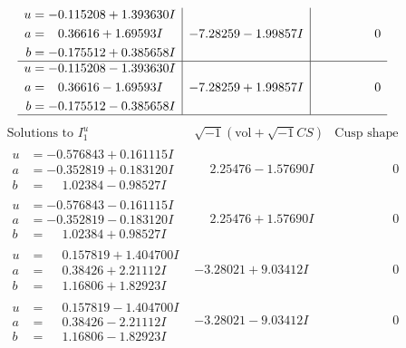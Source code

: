 \documentclass[1p]{elsarticle_modified}
\theoremstyle{definition}
\newcommand{\I}{\sqrt{-1}}
\begin{document}
$$\begin{array}{c|c|c}
\begin{aligned}
u &= -0.115208 + 1.393630 I \\
a &= \phantom{-}0.36616 + 1.69593 I \\
b &= -0.175512 + 0.385658 I\end{aligned}
 & -7.28259 - 1.99857 I & \phantom{-0.000000 } 0 \\ \hline\begin{aligned}
u &= -0.115208 - 1.393630 I \\
a &= \phantom{-}0.36616 - 1.69593 I \\
b &= -0.175512 - 0.385658 I\end{aligned}
 & -7.28259 + 1.99857 I & \phantom{-0.000000 } 0\\
 \hline 
 \end{array}$$\newpage$$\begin{array}{c|c|c}  
\text{Solutions to }I^u_{1}& \I (\text{vol} + \sqrt{-1}CS) & \text{Cusp shape}\\
 \hline 
\begin{aligned}
u &= -0.576843 + 0.161115 I \\
a &= -0.352819 + 0.183120 I \\
b &= \phantom{-}1.02384 - 0.98527 I\end{aligned}
 & \phantom{-}2.25476 - 1.57690 I & \phantom{-0.000000 } 0 \\ \hline\begin{aligned}
u &= -0.576843 - 0.161115 I \\
a &= -0.352819 - 0.183120 I \\
b &= \phantom{-}1.02384 + 0.98527 I\end{aligned}
 & \phantom{-}2.25476 + 1.57690 I & \phantom{-0.000000 } 0 \\ \hline\begin{aligned}
u &= \phantom{-}0.157819 + 1.404700 I \\
a &= \phantom{-}0.38426 + 2.21112 I \\
b &= \phantom{-}1.16806 + 1.82923 I\end{aligned}
 & -3.28021 + 9.03412 I & \phantom{-0.000000 } 0 \\ \hline\begin{aligned}
u &= \phantom{-}0.157819 - 1.404700 I \\
a &= \phantom{-}0.38426 - 2.21112 I \\
b &= \phantom{-}1.16806 - 1.82923 I\end{aligned}
 & -3.28021 - 9.03412 I & \phantom{-0.000000 } 0 \\ \hline\begin{aligned}

\end{aligned}
\end{array}$$
\end{document}
